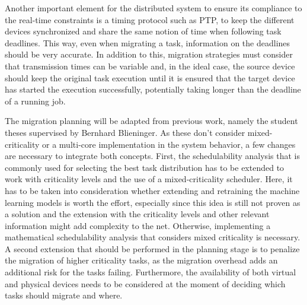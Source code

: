 Another important element for the distributed system to ensure its compliance to the real-time constraints is a timing protocol such as PTP, to keep the different devices synchronized and share the same notion of time when following task deadlines. This way, even when migrating a task, information on the deadlines should be very accurate. In addition to this, migration strategies must consider that transmission times can be variable and, in the ideal case, the source device should keep the original task execution until it is ensured that the target device has started the execution successfully, potentially taking longer than the deadline of a running job.

The migration planning will be adapted from previous work, namely the student theses supervised by Bernhard Blieninger. As these don't consider mixed-criticality or a multi-core implementation in the system behavior, a few changes are necessary to integrate both concepts. First, the schedulability analysis that is commonly used for selecting the best task distribution has to be extended to work with criticality levels and the use of a mixed-criticality scheduler. Here, it has to be taken into consideration whether extending and retraining the machine learning models is worth the effort, especially since this idea is still not proven as a solution and the extension with the criticality levels and other relevant information might add complexity to the net. Otherwise, implementing a mathematical schedulability analysis that considers mixed criticality is necessary. A second extension that should be performed in the planning stage is to penalize the migration of higher criticality tasks, as the migration overhead adds an additional risk for the tasks failing. Furthermore, the availability of both virtual and physical devices needs to be considered at the moment of deciding which tasks should migrate and where.

